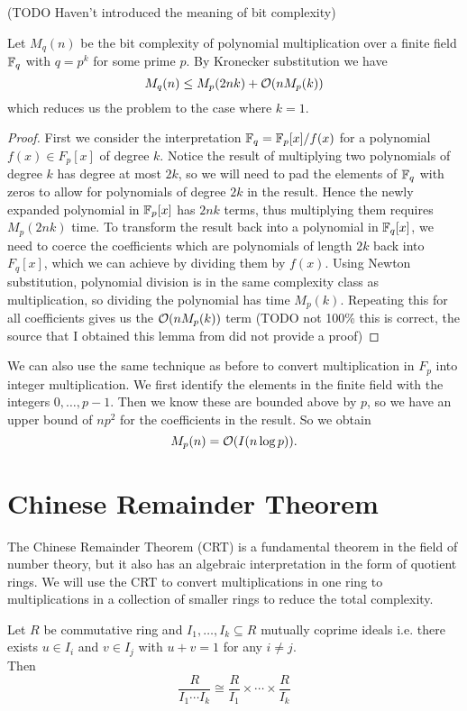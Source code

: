 (TODO Haven't introduced the meaning of bit complexity)
\begin{lemma}
    Let $M_q(n)$ be the bit complexity of polynomial multiplication over a finite field ${\mathbb F}_q$ with $q = p^k$ for some prime $p$. By Kronecker substitution we have
    \[
        M_q(n) \leq M_p(2nk) + \mathcal O(n M_p(k))
    \]
    which reduces us the problem to the case where $k = 1$.
\end{lemma}

\begin{proof}
    First we consider the interpretation ${\mathbb F}_q = {\mathbb F}_p[x] / f(x)$ for a polynomial $f(x) \in F_p[x]$ of degree $k$. Notice the result of multiplying two polynomials of degree $k$ has degree at most $2k$, so we will need to pad the elements of ${\mathbb F}_q$ with zeros to allow for polynomials of degree $2k$ in the result. Hence the newly expanded polynomial in ${\mathbb F}_p[x]$ has $2nk$ terms, thus multiplying them requires $M_p(2nk)$ time. To transform the result back into a polynomial in ${\mathbb F}_q[x]$, we need to coerce the coefficients which are polynomials of length $2k$ back into $F_q[x]$, which we can achieve by dividing them by $f(x)$. Using Newton substitution, polynomial division is in the same complexity class as multiplication, so dividing the polynomial has time $M_p(k)$. Repeating this for all coefficients gives us the $\mathcal O(n M_p(k))$ term (TODO not 100\% this is correct, the source that I obtained this lemma from did not provide a proof)
\end{proof}

We can also use the same technique as before to convert multiplication in $F_p$ into integer multiplication. We first identify the elements in the finite field with the integers $0,\ldots, p-1$. Then we know these are bounded above by $p$, so we have an upper bound of $np^2$ for the coefficients in the result. So we obtain
\[
    M_p(n) = \mathcal O(I(n \log p)).
\]

\section{Chinese Remainder Theorem}%
\label{sec:crt}

The Chinese Remainder Theorem (CRT) is a fundamental theorem in the field of number theory, but it also has an algebraic interpretation in the form of quotient rings. We will use the CRT to convert multiplications in one ring to multiplications in a collection of smaller rings to reduce the total complexity.

\begin{theorem}
    Let $R$ be commutative ring and $I_1, \ldots, I_k \subseteq R$ mutually coprime ideals i.e. there exists $u \in I_i$ and $v \in I_j$ with $u + v = 1$ for any $i \neq j$.\\
    Then
    \[
        \frac{R}{I_1\cdots I_k} \cong \frac{R}{I_1} \times \cdots \times \frac{R}{I_k}
    \]
\end{theorem}

